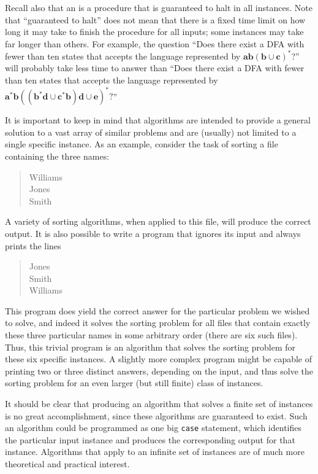 Recall also that an  is a procedure that is guaranteed to halt in all
instances. Note that ``guaranteed to halt'' does not mean that there is a fixed
time limit on how long it may take to finish the procedure for all inputs; some
instances may take far longer than others. For example, the question ``Does
there exist a DFA with fewer than ten states that accepts the language
represented by $\pmb{ab}(\pmb{b}\cup\pmb{c})^*$?'' will probably take less time
to answer than ``Does there exist a DFA with fewer than ten states that accepts
the language represented by $\pmb{a}^*\pmb{b}((\pmb{b}^*\pmb{d}\cup\pmb{c}^*
\pmb{b})\pmb{d}\cup\pmb{e})^*?$''

It is important to keep in mind that algorithms are intended to provide a
general solution to a vast array of similar problems and are (usually) not
limited to a single specific instance. As an example, consider the task of
sorting a file containing the three names:
\begin{quote}
Williams \\
Jones \\
Smith
\end{quote}
A variety of sorting algorithms, when applied to this file, will produce the
correct output. It is also possible to write a program that ignores its input
and always prints the lines
\begin{quote}
Jones \\
Smith \\
Williams
\end{quote}
This program does yield the correct answer for the particular problem we wished
to solve, and indeed it solves the sorting problem for all files that contain
exactly these three particular names in some arbitrary order (there are six such
files). Thus, this trivial program is an algorithm that solves the sorting
problem for these six specific instances. A slightly more complex program might
be capable of printing two or three distinct answers, depending on the input,
and thus solve the sorting problem for an even larger (but still finite) class
of instances.

It should be clear that producing an algorithm that solves a finite set of
instances is no great accomplishment, since these algorithms are guaranteed to
exist. Such an algorithm could be programmed as one big {\tt case} statement, which
identifies the particular input instance and produces the corresponding output
for that instance. Algorithms that apply to an infinite set of instances are of
much more theoretical and practical interest.

